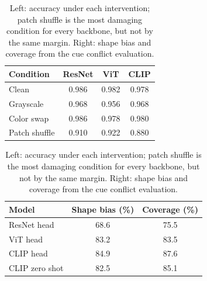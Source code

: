 \documentclass{article}
\begin{document}
\begin{table}[H]
  \centering
  \small
  \begin{minipage}{0.46\linewidth}
    \centering
    \begin{tabular}{lccc}
      \toprule
      Condition & ResNet & ViT & CLIP \\
      \midrule
      Clean         & 0.986 & 0.982 & 0.978 \\
      Grayscale     & 0.968 & 0.956 & 0.968 \\
      Color swap    & 0.986 & 0.978 & 0.980 \\
      Patch shuffle & 0.910 & 0.922 & 0.880 \\
      \bottomrule
    \end{tabular}
  \end{minipage}\hfill
  \begin{minipage}{0.5\linewidth}
    \centering
    \begin{tabular}{lcc}
      \toprule
      Model & Shape bias (\%) & Coverage (\%) \\
      \midrule
      ResNet head     & 68.6 & 75.5 \\
      ViT head        & 83.2 & 83.5 \\
      CLIP head       & 84.9 & 87.6 \\
      CLIP zero shot  & 82.5 & 85.1 \\
      \bottomrule
    \end{tabular}
  \end{minipage}
  \vspace{8pt}
  \caption{Left: accuracy under each intervention; patch shuffle is the most
  damaging condition for every backbone, but not by the same margin. Right:
  shape bias and coverage from the cue conflict evaluation.}
  \label{tab:task1-main}
  \label{tab:task1-shapebias}
\end{table}
\end{document}
